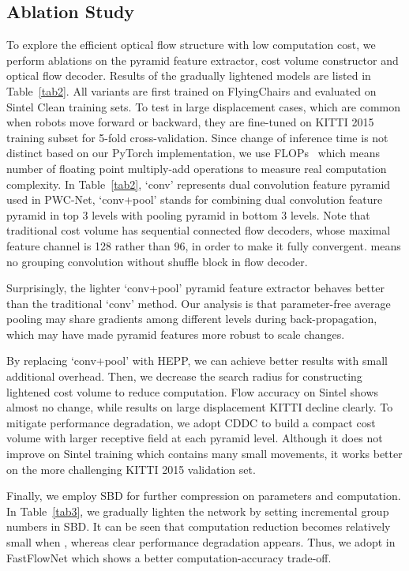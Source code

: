 \documentclass[letterpaper, 10 pt, conference]{ieeeconf}
\begin{document}
\subsection{Ablation Study}
To explore the efficient optical flow structure with low computation cost, we perform  ablations on the pyramid feature extractor, cost volume constructor and optical flow decoder. Results of the gradually lightened models are listed in Table~\ref{tab2}. All variants are first trained on FlyingChairs and evaluated on Sintel Clean training sets. To test in large displacement cases, which are common when robots move forward or backward, they are fine-tuned on KITTI 2015 training subset for 5-fold cross-validation. Since change of inference time 
is not distinct based on our PyTorch implementation, we use FLOPs~\cite{howard2017mobilenets, 8578814} which means number of floating point multiply-add operations to measure real computation complexity. In Table~\ref{tab2}, `conv' represents dual convolution feature pyramid used in PWC-Net, `conv+pool' stands for combining dual convolution feature pyramid in top 3 levels with pooling pyramid in bottom 3 levels. Note that traditional  cost volume has sequential connected flow decoders, whose maximal feature channel is 128 rather than 96, in order to make it fully convergent.  means no grouping convolution without shuffle block in flow decoder.



Surprisingly, the lighter `conv+pool' pyramid feature extractor behaves better than the traditional `conv' method. Our analysis is that parameter-free average pooling may share gradients among different levels during back-propagation, which may have  made pyramid features more robust to scale changes. 

By replacing `conv+pool' with HEPP, we can achieve  better results with small additional overhead. Then, we decrease the search radius for constructing lightened  cost volume to reduce computation. 
Flow accuracy on Sintel shows 
almost no change, while results on large displacement KITTI decline clearly. To mitigate performance degradation, we adopt CDDC to build a compact cost volume with larger receptive field at each pyramid level. Although it does not improve on Sintel training which contains 
many 
small movements, it works 
better on the more challenging KITTI 2015 validation set. 

Finally, we employ SBD for further compression on parameters and computation. In Table~\ref{tab3}, we gradually lighten the network by setting incremental group numbers in SBD. It can be seen that computation reduction becomes relatively small when , whereas 
clear 
performance degradation appears. Thus, we adopt  in FastFlowNet which shows a 
better computation-accuracy trade-off.
\end{document}
